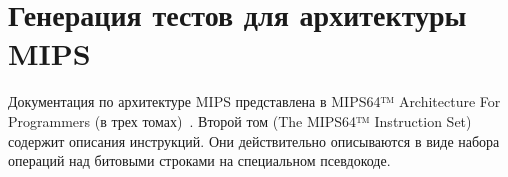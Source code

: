 
\section{Генерация тестов для архитектуры MIPS}\label{sec:mips_application}


Документация по архитектуре MIPS представлена в MIPS64™ Architecture For Programmers (в трех томах)~\cite{mips64II, mips64III}. Второй том (The MIPS64™ Instruction Set) содержит описания инструкций. Они  действительно описываются в виде набора операций над битовыми строками на специальном псевдокоде.%

%
%
%
%
%
%
%
%
%
%
%
%
%
%
%
%

